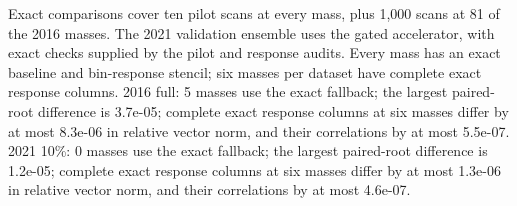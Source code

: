 Exact comparisons cover ten pilot scans at every mass, plus 1,000 scans at 81 of the 2016 masses. The 2021 validation ensemble uses the gated accelerator, with exact checks supplied by the pilot and response audits. Every mass has an exact baseline and bin-response stencil; six masses per dataset have complete exact response columns. 2016 full: 5 masses use the exact fallback; the largest paired-root difference is 3.7e-05; complete exact response columns at six masses differ by at most 8.3e-06 in relative vector norm, and their correlations by at most 5.5e-07. 2021 10\%: 0 masses use the exact fallback; the largest paired-root difference is 1.2e-05; complete exact response columns at six masses differ by at most 1.3e-06 in relative vector norm, and their correlations by at most 4.6e-07.
